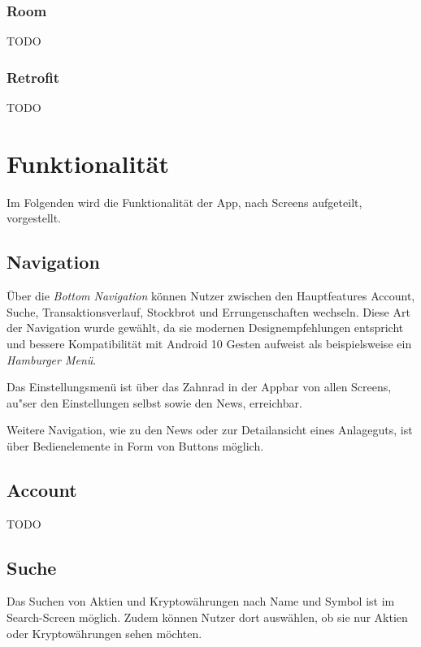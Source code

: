 \documentclass[a4paper]{article}
\begin{document}
\subsubsection{Room}
\label{subsubsec:technologies:bibs:room}
TODO


\subsubsection{Retrofit}
\label{subsubsec:technologies:bibs:retrofit}
TODO


\section{Funktionalität}
\label{sec:functionality}
Im Folgenden wird die Funktionalität der App, nach Screens aufgeteilt, vorgestellt.


\subsection{Navigation}
\label{subsec:functionality:navigation}
Über die \textit{Bottom Navigation}\autocite{bottom_navigation} können Nutzer zwischen den Hauptfeatures Account, Suche, Transaktionsverlauf, Stockbrot und Errungenschaften wechseln.
Diese Art der Navigation wurde gewählt, da sie modernen Designempfehlungen entspricht und bessere Kompatibilität mit Android 10 Gesten aufweist als beispielsweise ein \textit{Hamburger Menü}.

Das Einstellungsmenü ist über das Zahnrad in der Appbar von allen Screens, au"ser den Einstellungen selbst sowie den News, erreichbar.

Weitere Navigation, wie zu den News oder zur Detailansicht eines Anlageguts, ist über Bedienelemente in Form von Buttons möglich.


\subsection{Account}
\label{subsec:functionality:account}
TODO


\subsection{Suche}
\label{subsec:functionality:search}
Das Suchen von Aktien und Kryptowährungen nach Name und Symbol ist im Search-Screen möglich.
Zudem können Nutzer dort auswählen, ob sie nur Aktien oder Kryptowährungen sehen möchten.
\end{document}
